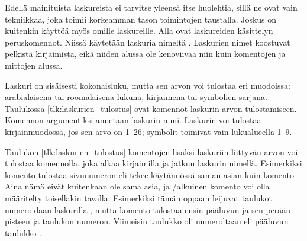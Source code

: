 Edellä mainituista laskureista ei tarvitse yleensä itse huolehtia, sillä
ne ovat vain tekniikkaa, joka toimii korkeamman tason toimintojen
taustalla. Joskus on kuitenkin käyttöä myös omille laskureille. Alla
ovat laskureiden käsittelyn peruskomennot. Niissä käytetään laskuria
nimeltä . Laskurien nimet koostuvat pelkistä kirjaimista,
eikä niiden alussa ole kenoviivaa niin kuin komentojen ja mittojen
alussa.

\begin{koodilohkosis}
  \setcounter{oma}{3}    %
  \addtocounter{oma}{1}  %
  \addtocounter{oma}{-1} %
\end{koodilohkosis}

Laskuri on sisäisesti kokonaisluku, mutta sen arvon voi tulostaa eri
muodoissa: arabialaisena tai roomalaisena lukuna, kirjaimena tai
symbolien sarjana. Taulukossa \ref{tlk:laskurien_tulostus} ovat komennot
laskurin arvon tulostamiseen. Komennon argumentiksi annetaan laskurin
nimi. Laskurin voi tulostaa kirjainmuodossa, jos sen arvo on 1--26;
symbolit toimivat vain lu\-ku\-alueel\-la 1--9.


Taulukon \ref{tlk:laskurien_tulostus} komentojen lisäksi laskuriin
liittyvän arvon voi tulostaa komennolla, joka alkaa kirjaimilla
 ja jatkuu laskurin nimellä. Esimerkiksi komento
 tulostaa sivunumeron eli tekee käytännössä saman
asian kuin komento . Aina nämä eivät
kuitenkaan ole sama asia, ja \-/alkuinen komento voi
olla määritelty toisellakin tavalla. Esimerkiksi tämän oppaan leijuvat
taulukot numeroidaan laskurilla , mutta komento
 tulostaa ensin pääluvun ja sen perään pisteen
ja taulukon numeron. Viimeisin taulukko oli numeroltaan \thetable{} eli
pääluvun  taulukko .

